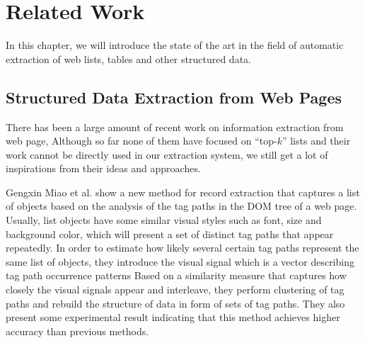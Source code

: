 \chapter{Related Work}
\label{sec:related}

In this chapter, we will introduce
the state of the art in the field of automatic extraction
of web lists, tables and other structured data.


\section{Structured Data Extraction from Web Pages}

There has been a large amount of recent work on information extraction from web page,
Although so far none of them have focused on ``top-$k$'' lists
and their work cannot be directly used in our extraction system,
we still get a lot of inspirations from their ideas and approaches.


Gengxin Miao et al. \cite{MiaoTHSM09:TagPathClustering}
show a new method for record extraction that captures a list
of objects based on the analysis of the tag paths
in the DOM tree of a web page.
Usually, list objects have some similar visual styles such as font,
size and background color, which will present a set of distinct tag paths
that appear repeatedly.
In order to estimate how likely several certain tag paths
represent the same list of objects,
they introduce the visual signal
which is a vector describing tag path occurrence patterns
Based on a similarity measure that captures how
closely the visual signals appear and interleave,
they perform clustering of tag paths
and rebuild the structure of data in form of sets of tag paths.
They also present some experimental result indicating
that this method achieves higher accuracy than previous methods.




